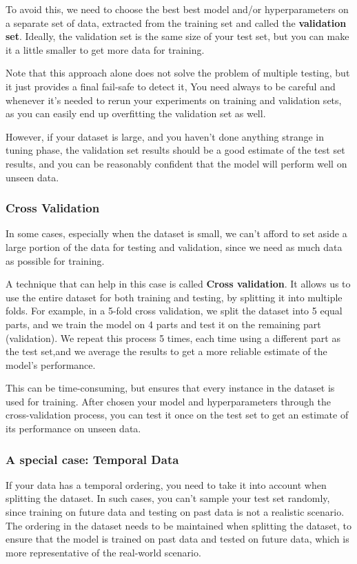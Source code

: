 To avoid this, we need to choose the best best model and/or hyperparameters on a separate set of data, 
extracted from the training set and called the \textbf{validation set}.
Ideally, the validation set is the same size of your test set, but you can make it a little smaller to get more data for training.

Note that this approach alone does not solve the problem of multiple testing, but it just provides 
a final fail-safe to detect it,
You need always to be careful and whenever it's needed to rerun your experiments on training and validation sets, 
as you can easily end up overfitting the validation set as well.

However, if your dataset is large, and you haven't done anything strange in tuning phase, 
the validation set results should be a good estimate of the test set results, and you can be reasonably confident that the model will perform well on unseen data.

\subsubsection*{Cross Validation}
In some cases, especially when the dataset is small, we can't afford to set aside a large portion of the data for testing and validation, 
since we need as much data as possible for training.

A technique that can help in this case is called \textbf{Cross validation}.
It allows us to use the entire dataset for both training and testing, by splitting it into multiple folds.
For example, in a 5-fold cross validation, we split the dataset into 5 equal parts, and we train the model on 4 parts and test it on the remaining part (validation).
We repeat this process 5 times, each time using a different part as the test set,and we average the results to get a more reliable estimate of the model's performance.

This can be time-consuming, but ensures that every instance in the dataset is used for training.
After chosen your model and hyperparameters through the cross-validation process, you can test it once on the test set to get an estimate of its performance on unseen data.

\subsubsection*{A special case: Temporal Data}
If your data has a temporal ordering, you need to take it into account when splitting the dataset.
In such cases, you can't sample your test set randomly, since training on future data and testing on past data is not a realistic scenario.
The ordering in the dataset needs to be maintained when splitting the dataset, 
to ensure that the model is trained on past data and tested on future data, which is more representative of the real-world scenario.

